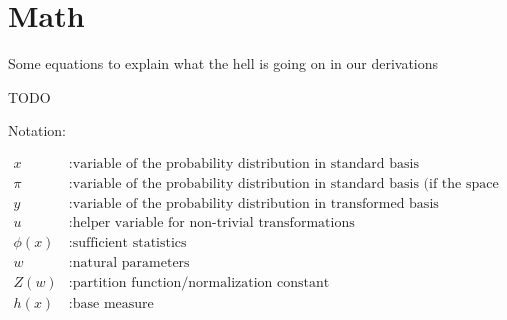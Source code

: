 \section{Math}

Some equations to explain what the hell is going on in our derivations

TODO

Notation:

\begin{align*}
	x &: \text{variable of the probability distribution in standard basis} \\
	\pi &: \text{variable of the probability distribution in standard basis (if the space is a probability space)} \\
	y &: \text{variable of the probability distribution in transformed basis} \\
	u &: \text{helper variable for non-trivial transformations} \\
	\phi(x)  &:	\text{sufficient statistics} \\	
	w &: \text{natural parameters} \\
	Z(w) &: \text{partition function/normalization constant} \\
	h(x) &: \text{base measure}
\end{align*}